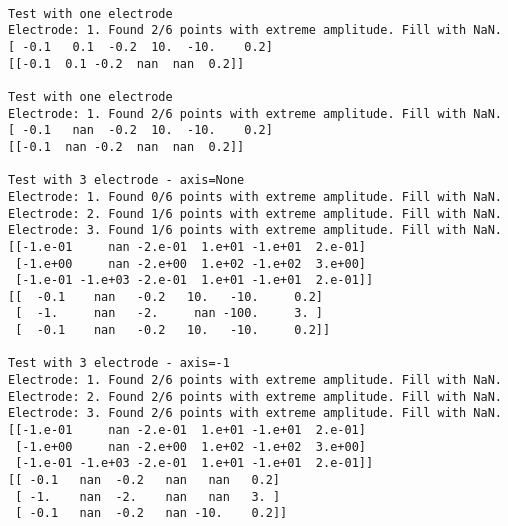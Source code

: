 \documentclass[11pt]{article}
\begin{document}
    \begin{Verbatim}[commandchars=\\\{\}]

Test with one electrode
Electrode: 1. Found 2/6 points with extreme amplitude. Fill with NaN.
[ -0.1   0.1  -0.2  10.  -10.    0.2]
[[-0.1  0.1 -0.2  nan  nan  0.2]]

Test with one electrode
Electrode: 1. Found 2/6 points with extreme amplitude. Fill with NaN.
[ -0.1   nan  -0.2  10.  -10.    0.2]
[[-0.1  nan -0.2  nan  nan  0.2]]

Test with 3 electrode - axis=None
Electrode: 1. Found 0/6 points with extreme amplitude. Fill with NaN.
Electrode: 2. Found 1/6 points with extreme amplitude. Fill with NaN.
Electrode: 3. Found 1/6 points with extreme amplitude. Fill with NaN.
[[-1.e-01     nan -2.e-01  1.e+01 -1.e+01  2.e-01]
 [-1.e+00     nan -2.e+00  1.e+02 -1.e+02  3.e+00]
 [-1.e-01 -1.e+03 -2.e-01  1.e+01 -1.e+01  2.e-01]]
[[  -0.1    nan   -0.2   10.   -10.     0.2]
 [  -1.     nan   -2.     nan -100.     3. ]
 [  -0.1    nan   -0.2   10.   -10.     0.2]]

Test with 3 electrode - axis=-1
Electrode: 1. Found 2/6 points with extreme amplitude. Fill with NaN.
Electrode: 2. Found 2/6 points with extreme amplitude. Fill with NaN.
Electrode: 3. Found 2/6 points with extreme amplitude. Fill with NaN.
[[-1.e-01     nan -2.e-01  1.e+01 -1.e+01  2.e-01]
 [-1.e+00     nan -2.e+00  1.e+02 -1.e+02  3.e+00]
 [-1.e-01 -1.e+03 -2.e-01  1.e+01 -1.e+01  2.e-01]]
[[ -0.1   nan  -0.2   nan   nan   0.2]
 [ -1.    nan  -2.    nan   nan   3. ]
 [ -0.1   nan  -0.2   nan -10.    0.2]]

    \end{Verbatim}
\end{document}

